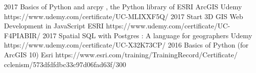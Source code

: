 \documentclass[]{friggeri-cv}
\begin{document}
\begin{entrylist}
    \entry
    {2017}
    {Basics of Python and arcpy , the Python library of ESRI ArcGIS}
    {Udemy}
    {https://www.udemy.com/certificate/UC-MLIXXF5Q/}
    \entry
    {2017}
    {Start 3D GIS Web Development in JavaScript}
    {ESRI}
    {https://www.udemy.com/certificate/UC-F4PIABIR/}
    \entry
    {2017}
    {Spatial SQL with Postgres : A language for geographers}
    {Udemy}
    {https://www.udemy.com/certificate/UC-X32K73CP/}
    \entry
    {2016}
    {Basics of Python (for ArcGIS 10)}
    {Esri}
    {{https://www.esri.com/training/TrainingRecord/Certificate/}\\{cclenism/573dfdfdbc33c97d06fad63f/300}}
\end{entrylist}

\begin{entrylist}

\end{entrylist}

\begin{flushleft}
\emph{}
\end{flushleft}
\begin{flushright}
\emph{}
\end{flushright}
\end{document}
